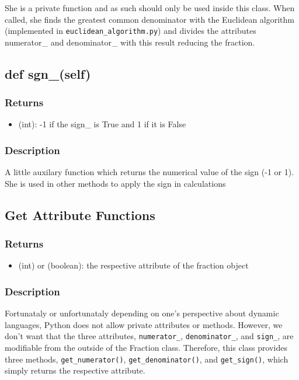 \documentclass[refman]{scrartcl}
\begin{document}
She is a private function and as such should only be used inside this class. When called, she finds the greatest common denominator with the Euclidean algorithm (implemented in \texttt{euclidean\_algorithm.py}) and divides the attributes numerator\_ and denominator\_ with this result reducing the fraction.

\subsection{def sgn\_(self)}

\subsubsection*{Returns}

\begin{itemize}
	\item (int): -1 if the sign\_ is True and 1 if it is False
\end{itemize}

\subsubsection*{Description}

A little auxilary function which returns the numerical value of the sign (-1 or 1). She is used in other methods to apply the sign in calculations

\subsection{Get Attribute Functions}

\subsubsection*{Returns}

\begin{itemize}
	\item (int) or (boolean): the respective attribute of the fraction object
\end{itemize}

\subsubsection*{Description}

Fortunataly or unfortunataly depending on one's perspective about dynamic languages, Python does not allow private attributes or methods. However, we don't want that the three attributes, \texttt{numerator\_}, \texttt{denominator\_}, and \texttt{sign\_}, are modifiable from the outside of the Fraction class. Therefore, this class provides three methods, \texttt{get\_numerator()}, \texttt{get\_denominator()}, and \texttt{get\_sign()}, which simply returns the respective attribute.
\end{document}
